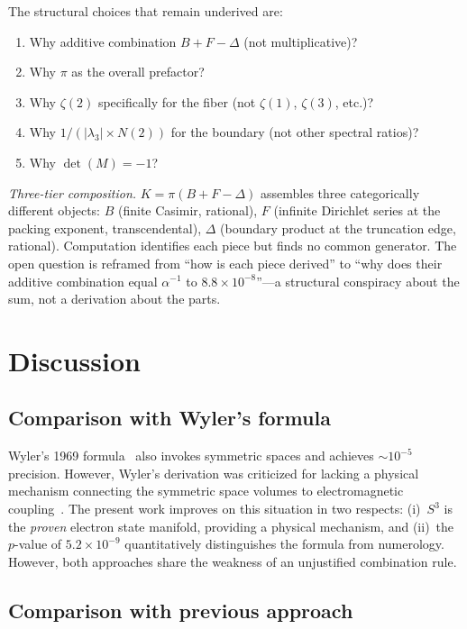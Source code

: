 \documentclass[aps,prl,twocolumn,superscriptaddress]{revtex4-2}
\begin{document}
The structural choices that remain underived are:
\begin{enumerate}
\item Why additive combination $B + F - \Delta$ (not multiplicative)?
\item Why $\pi$ as the overall prefactor?
\item Why $\zeta(2)$ specifically for the fiber (not $\zeta(1)$,
  $\zeta(3)$, etc.)?
\item Why $1/(|\lambda_3| \times N(2))$ for the boundary (not other
  spectral ratios)?
\item Why $\det(M) = -1$?
\end{enumerate}

\textit{Three-tier composition.} $K = \pi(B + F - \Delta)$ assembles
three categorically different objects: $B$ (finite Casimir, rational),
$F$ (infinite Dirichlet series at the packing exponent,
transcendental), $\Delta$ (boundary product at the truncation edge,
rational). Computation identifies each piece but finds no common
generator. The open question is reframed from ``how is each piece
derived'' to ``why does their additive combination equal
$\alpha^{-1}$ to $8.8\times 10^{-8}$''---a structural conspiracy
about the sum, not a derivation about the parts.


\section{Discussion}

\subsection{Comparison with Wyler's formula}

Wyler's 1969 formula~\cite{wyler1969} also invokes symmetric spaces
and achieves $\sim 10^{-5}$ precision. However, Wyler's derivation
was criticized for lacking a physical mechanism connecting the
symmetric space volumes to electromagnetic
coupling~\cite{robertson1971}. The present work improves on this
situation in two respects: (i)~$S^3$ is the \textit{proven} electron
state manifold, providing a physical mechanism, and (ii)~the
$p$-value of $5.2 \times 10^{-9}$ quantitatively distinguishes the
formula from numerology. However, both approaches share the weakness
of an unjustified combination rule.

\subsection{Comparison with previous approach}
\end{document}
